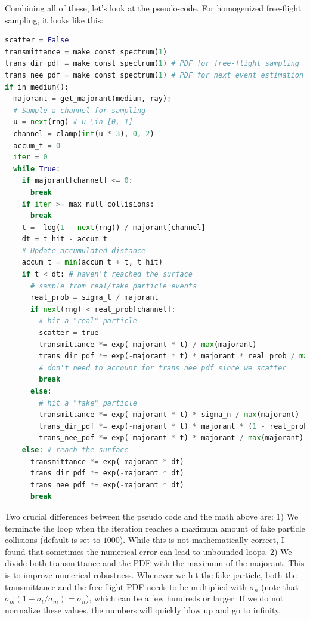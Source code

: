 Combining all of these, let's look at the pseudo-code. For homogenized free-flight sampling, it looks like this:
\begin{lstlisting}[language=python]
scatter = False
transmittance = make_const_spectrum(1)
trans_dir_pdf = make_const_spectrum(1) # PDF for free-flight sampling
trans_nee_pdf = make_const_spectrum(1) # PDF for next event estimation
if in_medium():
  majorant = get_majorant(medium, ray);
  # Sample a channel for sampling
  u = next(rng) # u \in [0, 1]
  channel = clamp(int(u * 3), 0, 2)
  accum_t = 0
  iter = 0
  while True:
    if majorant[channel] <= 0:
      break
    if iter >= max_null_collisions:
      break
    t = -log(1 - next(rng)) / majorant[channel]
    dt = t_hit - accum_t
    # Update accumulated distance
    accum_t = min(accum_t + t, t_hit)
    if t < dt: # haven't reached the surface
      # sample from real/fake particle events
      real_prob = sigma_t / majorant
      if next(rng) < real_prob[channel]:
        # hit a "real" particle
        scatter = true
        transmittance *= exp(-majorant * t) / max(majorant)
        trans_dir_pdf *= exp(-majorant * t) * majorant * real_prob / max(majorant)
        # don't need to account for trans_nee_pdf since we scatter
        break
      else:
        # hit a "fake" particle
        transmittance *= exp(-majorant * t) * sigma_n / max(majorant)
        trans_dir_pdf *= exp(-majorant * t) * majorant * (1 - real_prob) / max(majorant)
        trans_nee_pdf *= exp(-majorant * t) * majorant / max(majorant)
    else: # reach the surface
      transmittance *= exp(-majorant * dt)
      trans_dir_pdf *= exp(-majorant * dt)
      trans_nee_pdf *= exp(-majorant * dt)
      break
\end{lstlisting}

Two crucial differences between the pseudo code and the math above are:
1) We terminate the loop when the iteration reaches a maximum amount of fake particle collisions 
(default is set to $1000$). While this is not mathematically correct, I found that sometimes
the numerical error can lead to unbounded loops.
2) We divide both transmittance and the PDF with the maximum of the majorant. This is to improve
numerical robustness. Whenever we hit the fake particle, both the transmittance and
the free-flight PDF needs to be multiplied with $\sigma_n$ (note that $\sigma_m (1 - \sigma_t / \sigma_m) = \sigma_n$),
which can be a few hundreds or larger. If we do not normalize these values, the numbers will
quickly blow up and go to infinity.

